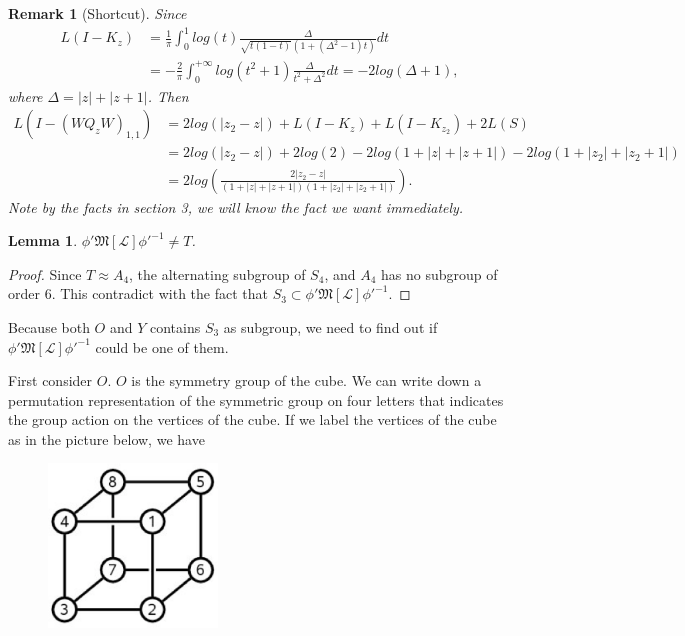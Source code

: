 \documentclass{amsart}
\newcommand{\LLL}{\mathcal L} %
\newcommand{\MMM}{\mathfrak M}
\newtheorem{lemma}{Lemma}[section]
\newtheorem{remark}{Remark}[section]
\begin{document}
\begin{remark}[Shortcut]
Since
\begin{align*}
L(I - K_z) &= \frac{1}{\pi}\int^{1}_{0} log(t)\frac{\Delta}{\sqrt{t(1-t)}(1 + (\Delta^2 -1)t)}dt\\
           &= -\frac{2}{\pi}\int^{+\infty}_{0}log(t^{2} + 1)\frac{\Delta}{t^{2} + \Delta^{2}}dt  = -2log(\Delta + 1),
\end{align*}
where $\Delta = |z| + |z + 1|$. Then
\begin{align*}
L(I - (WQ_zW)_{1,1}) &= 2log(|z_2 - z|) + L(I - K_{z}) + L(I - K_{z_2}) + 2L(S)\\
                     &= 2log(|z_2 - z|) + 2log(2) - 2log(1 + |z| + |z+1|) - 2log(1 + |z_2| + |z_2 +1|) \\
                     &= 2log(\frac{2|z_2 - z|}{(1 + |z| + |z+1|)(1 + |z_2| + |z_2 + 1|)}).
\end{align*}
Note by the facts in section 3, we will know the fact we want immediately.
\end{remark}

\begin{lemma}
$\phi' \MMM[\LLL] \phi'^{-1} \neq T$.
\end{lemma}

\begin{proof}
Since $T \approx A_4$, the alternating subgroup of $S_4$, and $A_4$ has no subgroup of order 6. This contradict with the
fact that $S_3 \subset \phi' \MMM[\LLL] \phi'^{-1}$.
\end{proof}

Because both $O$ and $Y$ contains $S_3$ as subgroup, we need to find out if $\phi' \MMM[\LLL] \phi'^{-1}$ could
be one of them.

First consider $O$. $O$ is the symmetry group of the cube. We can write down a permutation representation of
the symmetric group on four letters that indicates the group action on the vertices of the cube. If we label
the vertices of the cube as in the picture below, we have

\begin{figure}[H]
\begin{center}
\includegraphics [width=0.4\textwidth]{cube.pdf}
\caption{}
\end{center}
\end{figure}
\end{document}
